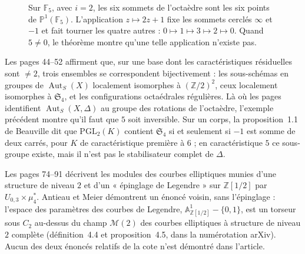 \documentclass[11pt,a4paper]{amsart}
\theoremstyle{definition}
\theoremstyle{plain}
\theoremstyle{remark}
\theoremstyle{plain}
\newcommand{\Z}{\mathbb Z}
\newcommand{\F}{\mathbb F}
\newcommand{\PP}{\mathbb P^1}
\newcommand{\PGL}{\mathrm{PGL}_2}
\begin{document}
\begin{figure}[htbp]
\centering
{}
\caption{Sur $\F_5$, avec $i = 2$, les six sommets de l'octaèdre sont les six points de $\PP(\F_5)$. L'application $z \mapsto 2z + 1$ fixe les sommets cerclés $\infty$ et $-1$ et fait tourner les quatre autres : $0 \mapsto 1 \mapsto 3 \mapsto 2 \mapsto 0$. Quand $5 \ne 0$, le théorème montre qu'une telle application n'existe pas.}\label{fig:f5}
\end{figure}

Les pages 44--52 affirment que, sur une base dont les caractéristiques résiduelles sont $\neq 2$, trois ensembles se correspondent bijectivement : les sous-schémas en groupes de $\operatorname{Aut}_S(X)$ localement isomorphes à $(\Z/2)^2$, ceux localement isomorphes à $\mathfrak S_4$, et les configurations octaédrales régulières. Là où les pages identifient $\operatorname{Aut}_S(X, \Delta)$ au groupe des rotations de l'octaèdre, l'exemple précédent montre qu'il faut que $5$ soit inversible. Sur un corps, la proposition~1.1 de Beauville dit que $\PGL(K)$ contient $\mathfrak S_4$ si et seulement si $-1$ est somme de deux carrés, pour $K$ de caractéristique première à $6$ ; en caractéristique $5$ ce sous-groupe existe, mais il n'est pas le stabilisateur complet de $\Delta$.

Les pages 74--91 décrivent les modules des courbes elliptiques munies d'une structure de niveau $2$ et d'un « épinglage de Legendre » sur $\Z[1/2]$ par $U_{0,3}\times\mu_4^*$. Antieau et Meier démontrent un énoncé voisin, sans l'épinglage : l'espace des paramètres des courbes de Legendre, $\mathbb A^1_{\Z[1/2]} - \{0, 1\}$, est un torseur sous $C_2$ au-dessus du champ $\mathcal M(2)$ des courbes elliptiques à structure de niveau $2$ complète (définition~4.4 et proposition~4.5, dans la numérotation arXiv). Aucun des deux énoncés relatifs de la cote n'est démontré dans l'article.
\end{document}
